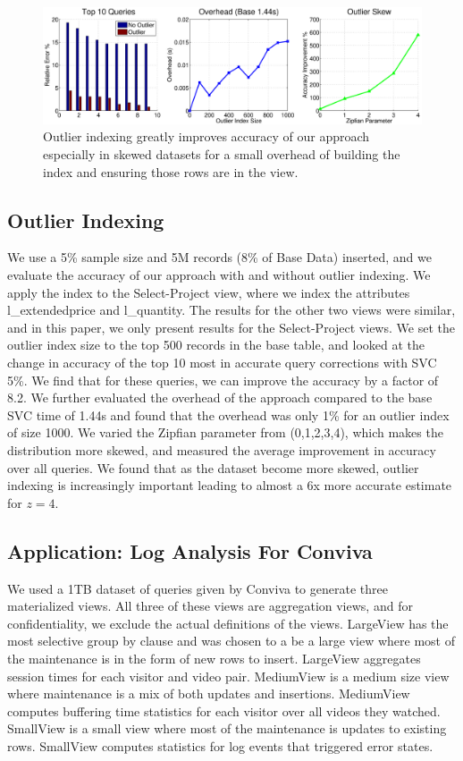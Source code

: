 \begin{figure}[ht!]
\hspace{-5em}
\includegraphics[scale=0.21]{exp/exp6-outlier-full.eps}
 \caption{Outlier indexing greatly improves accuracy of our approach especially in skewed datasets for a small overhead of building the index and ensuring those rows are in the view.\label{exp7outlier}}
\end{figure}

\subsection{Outlier Indexing}
We use a 5\% sample size and 5M records (8\% of Base Data) inserted, and we evaluate the accuracy of our approach with and without outlier indexing.
We apply the index to the Select-Project view, where we index the attributes l\_extendedprice and l\_quantity.
The results for the other two views were similar, and in this paper, we only present results for the Select-Project views.
We set the outlier index size to the top 500 records in the base table, and looked at the change in accuracy of the top 10 most in accurate query corrections with SVC 5\%.
We find that for these queries, we can improve the accuracy by a factor of 8.2.
We further evaluated the overhead of the approach compared to the base SVC time of 1.44s and found that the overhead was only 1\% for an outlier index of size 1000.
We varied the Zipfian parameter from (0,1,2,3,4), which makes the distribution more skewed, and measured the average improvement in accuracy over all queries.
We found that as the dataset become more skewed, outlier indexing is increasingly important leading to almost a 6x more accurate estimate for $z=4$.

\subsection{Application: Log Analysis For Conviva}
We used a 1TB dataset of queries given by Conviva to generate three materialized views.
All three of these views are aggregation views, and for confidentiality, we exclude the actual definitions of the views.
LargeView has the most selective group by clause and was chosen to a be a large view where most of the maintenance is in the form of new rows to insert.
LargeView aggregates session times for each visitor and video pair.
MediumView is a medium size view where maintenance is a mix of both updates and insertions.
MediumView computes buffering time statistics for each visitor over all videos they watched.
SmallView is a small view where most of the maintenance is updates to existing rows.
SmallView computes statistics for log events that triggered error states.

